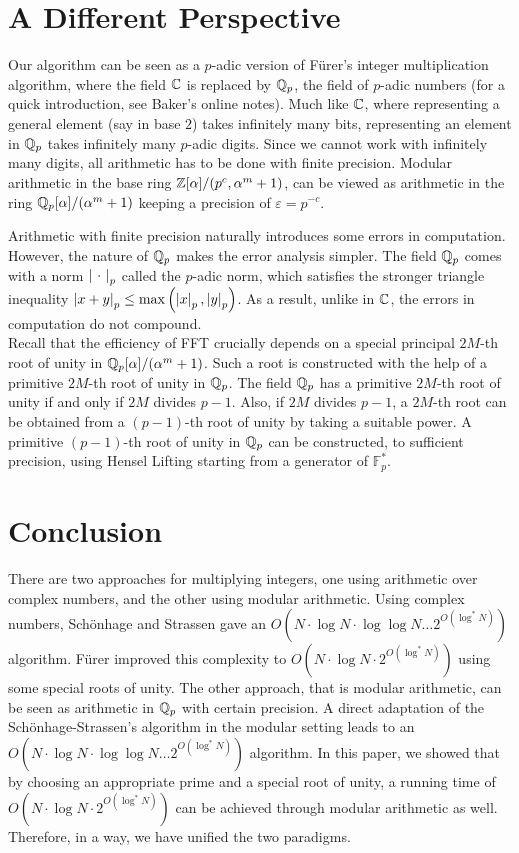 \documentclass[11pt]{article}
\begin{document}
\section{A Different Perspective } \label{Qp_section}

Our algorithm can be seen as a $p$-adic version of F\"{u}rer's integer
multiplication algorithm, where the field $\mathbb{C}$ is replaced by $\mathbb{Q}_p$,
the field of $p$-adic numbers (for a quick introduction, see Baker's
online notes\cite{Baker}). Much like $\mathbb{C}$, where representing a
general element (say in base $2$) takes infinitely many bits,
representing an element in $\mathbb{Q}_p$ takes infinitely many $p$-adic
digits. Since we cannot work with infinitely many digits, all
arithmetic has to be done with finite precision. Modular arithmetic in
the base ring $\mathbb{Z}[\alpha]/(p^c, \alpha^m + 1)$, can be viewed as
arithmetic in the ring $\mathbb{Q}_p[\alpha]/(\alpha^m + 1)$ keeping a
precision of $\varepsilon = p^{-c}$.

Arithmetic with finite precision naturally introduces some errors in
computation. However, the nature of $\mathbb{Q}_p$ makes the error analysis
simpler. The field $\mathbb{Q}_p$ comes with a norm $\left|\ \cdot\ \right|_p$ called
the $p$-adic norm, which satisfies the stronger triangle inequality
$\left|x+y\right|_p \leq \max\left(\left|x\right|_p, \left|y\right|_p\right)$\cite[Proposition
  2.6]{Baker}. As a result, unlike in $\mathbb{C}$, the errors in computation
do not compound.\\

Recall that the efficiency of FFT crucially depends on a special
principal $2M$-th root of unity in $\mathbb{Q}_p[\alpha]/(\alpha^m + 1)$. Such
a root is constructed with the help of a primitive $2M$-th root of
unity in $\mathbb{Q}_p$. The field $\mathbb{Q}_p$ has a primitive $2M$-th root of
unity if and only if $2M$ divides $p-1$\cite[Theorem
  5.12]{Baker}. Also, if $2M$ divides $p-1$, a $2M$-th root can be
obtained {}from a $(p-1)$-th root of unity by taking a suitable power. A
primitive $(p-1)$-th root of unity in $\mathbb{Q}_p$ can be constructed, to
sufficient precision, using Hensel Lifting starting {}from a generator
of $\mathbb{F}_p^*$.

\section{Conclusion}\label{conclusions_section}

There are two approaches for multiplying integers, one using
arithmetic over complex numbers, and the other using modular
arithmetic. Using complex numbers, Sch\"{o}nhage and
Strassen\cite{scho} gave an $O(N \cdot \log N \cdot \log\log N\ldots
2^{O(\log^* N)})$ algorithm. F\"{u}rer\cite{Furer} improved this
complexity to $O(N\cdot\log N \cdot2^{O(\log^*N)})$ using some special
roots of unity. The other approach, that is modular arithmetic, can be
seen as arithmetic in $\mathbb{Q}_p$ with certain precision. A direct
adaptation of the Sch\"{o}nhage-Strassen's algorithm in the modular
setting leads to an $O(N \cdot \log N \cdot \log\log N\ldots
2^{O(\log^* N)})$ algorithm. In this paper, we showed that by choosing
an appropriate prime and a special root of unity, a running time of
$O(N\cdot \log N \cdot 2^{O(\log^*N)})$ can be achieved through
modular arithmetic as well. Therefore, in a way, we have unified the
two paradigms.
\end{document}
